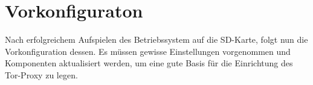\section{Vorkonfiguraton}
Nach erfolgreichem Aufspielen des Betriebssystem auf die SD-Karte, folgt nun die Vorkonfiguration dessen. Es müssen gewisse Einstellungen vorgenommen und Komponenten aktualisiert werden, um eine gute Basis für die Einrichtung des Tor-Proxy zu legen.


